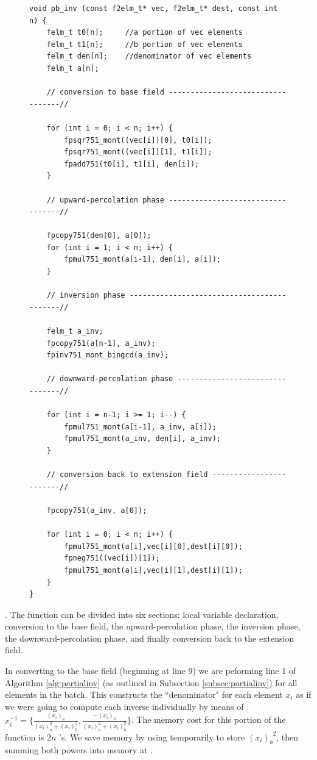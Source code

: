 \begin{figure}[!h]
\label{code:pbinv}
\begin{lstlisting}
void pb_inv (const f2elm_t* vec, f2elm_t* dest, const int n) {
	felm_t t0[n];     //a portion of vec elements
	felm_t t1[n];     //b portion of vec elements
	felm_t den[n];    //denominator of vec elements
	felm_t a[n];

	// conversion to base field ----------------------------------//

	for (int i = 0; i < n; i++) {
		fpsqr751_mont((vec[i])[0], t0[i]);
		fpsqr751_mont((vec[i])[1], t1[i]);
		fpadd751(t0[i], t1[i], den[i]);
	}	
	
	// upward-percolation phase ----------------------------------//

	fpcopy751(den[0], a[0]);
	for (int i = 1; i < n; i++) {
		fpmul751_mont(a[i-1], den[i], a[i]);
	}

	// inversion phase -------------------------------------------//
	
	felm_t a_inv;
	fpcopy751(a[n-1], a_inv);
	fpinv751_mont_bingcd(a_inv);
    
	// downward-percolation phase --------------------------------//

	for (int i = n-1; i >= 1; i--) {
		fpmul751_mont(a[i-1], a_inv, a[i]);
		fpmul751_mont(a_inv, den[i], a_inv);
	}

	// conversion back to extension field ------------------------//

	fpcopy751(a_inv, a[0]);

	for (int i = 0; i < n; i++) {
		fpmul751_mont(a[i],vec[i][0],dest[i][0]);
		fpneg751((vec[i])[1]);
		fpmul751_mont(a[i],vec[i][1],dest[i][1]);
	}
}
\end{lstlisting}
\caption{\pbinv}
\end{figure}

\noindent
\pbinv. The \pbinv function can be divided into six sections: local variable declaration, conversion to the base field, the upward-percolation phase, the inversion phase, the downward-percolation phase, and finally conversion back to the extension field.

In converting to the base field (beginning at line 9) we are peforming line 1 of Algorithm \ref{alg:partialinv} (as outlined in Subsection \ref{subsec:partialinv}) for all elements in the batch. This constructs the ``denominator" for each element $x_i$ as if we were going to compute each inverse individually by means of $x_i^{-1} = \{\frac {(x_i)_{a}}{(x_i)_{a}^2 + (x_i)_{b}^2}, \frac {-(x_i)_{b}}{(x_i)_{a}^2 + (x_i)_{b}^2}\}$. The memory cost for this portion of the function is $2n$ 's. We save memory by using  temporarily to store ${(x_i)_{b}}^2$, then summing both powers into memory at .

